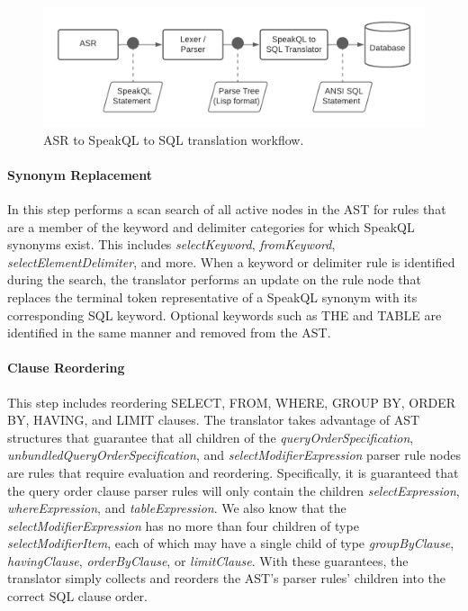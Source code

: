 \begin{figure}
  \centering
  \includegraphics[width=\linewidth]{figures/SpeakQL 2 to SQL Translation}
  \caption{ASR to SpeakQL to SQL translation workflow.}
  \label{fig:translationprocess}
\end{figure}

\paragraph{\textbf{Synonym Replacement}} 
In this step performs a scan search of all active nodes in the AST for rules that are a member of the keyword and delimiter categories for which SpeakQL synonyms exist. 
This includes \emph{selectKeyword}, \emph{fromKeyword}, \emph{selectElementDelimiter}, and more. 
When a keyword or delimiter rule is identified during the search, the translator performs an update on the rule node that replaces the terminal token representative of a SpeakQL synonym with its corresponding SQL keyword. 
Optional keywords such as THE and TABLE are identified in the same manner and removed from the AST.

\paragraph{\textbf{Clause Reordering}}
This step includes reordering SELECT, FROM, WHERE, GROUP BY, ORDER BY, HAVING, and LIMIT clauses. 
The translator takes advantage of AST structures that guarantee that all children of the \emph{queryOrderSpecification}, \emph{unbundledQueryOrderSpecification}, and \emph{selectModifierExpression} parser rule nodes are rules that require evaluation and reordering. 
Specifically, it is guaranteed that the query order clause parser rules will only contain the children \emph{selectExpression}, \emph{whereExpression}, and \emph{tableExpression}. 
We also know that the \emph{selectModifierExpression} has no more than four children of type \emph{selectModifierItem}, each of which may have a single child of type \emph{groupByClause}, \emph{havingClause}, \emph{orderByClause}, or \emph{limitClause}. 
With these guarantees, the translator simply collects and reorders the AST's parser rules' children into the correct SQL clause order.

